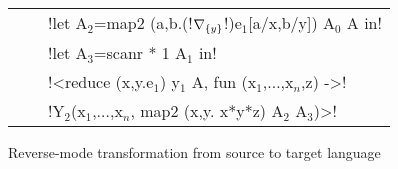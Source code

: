 \begin{figure*}[t]
\begin{tabular}{|r c l|}
            && !let A$_{2}$=map2 (a,b.(!$\nabla_{\{y\}}$!)e$_{1}$[a/x,b/y]) A$_{0}$ A in! \\
            && !let A$_{3}$=scanr * 1 A$_{1}$ in! \\
            && !<reduce (x,y.e$_{1}$) y$_{1}$ A, fun (x$_{1}$,$\ldots$,x$_n$,z) ->! \\
            && !Y$_{2}$(x$_{1}$,$\ldots$,x$_n$, map2 (x,y. x*y*z) A$_{2}$ A$_{3}$)>! \\ \hline
        \end{tabular}
    \vspace{-0.4cm}
    \caption{Reverse-mode transformation from source to target language}
    \label{fig:direct_diff_macro}    
    \vspace{-0.4cm}
\end{figure*}